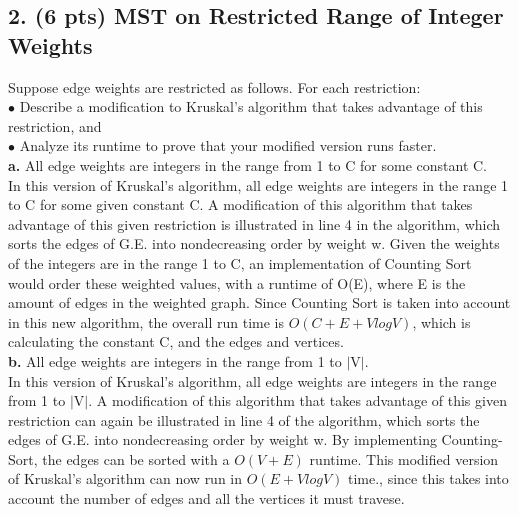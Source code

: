 \documentclass[12pt]{article}
\begin{document}
 \subsection*{2. (6 pts) MST on Restricted Range of Integer Weights}
 Suppose edge weights are restricted as follows. For each restriction: \\
 $\bullet$ Describe a modification to Kruskal's algorithm that takes advantage of this restriction, and \\
 $\bullet$ Analyze its runtime to prove that your modified version runs faster. \\
 \linebreak
 \textbf{a.} All edge weights are integers in the range from 1 to C for some constant C. \\
 In this version of Kruskal's algorithm, all edge weights are integers in the range 1 to C for some given constant C.  A modification of this algorithm that takes advantage of this given restriction is illustrated in line 4 in the algorithm, which sorts the edges of G.E. into nondecreasing order by weight w. Given the weights of the integers are in the range 1 to C,  an implementation of Counting Sort would order these weighted values, with a runtime of O(E), where E is the amount of edges in the weighted graph.  Since Counting Sort is taken into account in this new algorithm, the overall run time is $O(C+E+VlogV)$, which is calculating the constant C, and the edges and vertices. \\
 \linebreak
 \textbf{b.} All edge weights are integers in the range from 1 to $\lvert$V$\rvert$. \\
 In this version of Kruskal's algorithm, all edge weights are integers in the range from 1 to $\lvert$V$\rvert$.  A modification of this algorithm that takes advantage of this given restriction can again be illustrated in line 4 of the algorithm, which sorts the edges of G.E. into nondecreasing order by weight w. By implementing Counting-Sort, the edges can be sorted with a $O(V + E)$ runtime.  This modified version of Kruskal's algorithm can now run in $O(E+VlogV)$ time., since this takes into account the number of edges and all the vertices it must travese. \\
\end{document}
